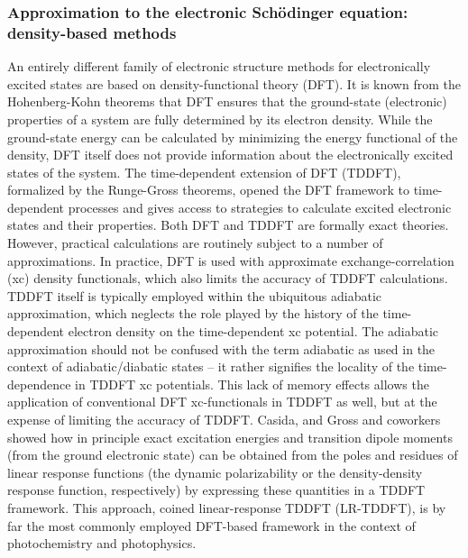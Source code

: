 \documentclass[9pt,bestpractices,pubversion]{livecoms}
\begin{document}
\subsubsection{Approximation to the electronic Sch\"{o}dinger equation: density-based methods}
\label{sec:dftbased}

An entirely different family of electronic structure methods for electronically excited states are based on density-functional theory (DFT). It is known from the Hohenberg-Kohn theorems\cite{hohenberg64} that DFT ensures that the ground-state (electronic) properties of a system are fully determined by its electron density. While the ground-state energy can be calculated by minimizing the energy functional of the density, DFT itself does not provide information about the electronically excited states of the system. The time-dependent extension of DFT (TDDFT),\cite{tddftcarsten} formalized by the Runge-Gross theorems,\cite{Runge84} opened the DFT framework to time-dependent processes and gives access to strategies to calculate excited electronic states and their properties. Both DFT and TDDFT are formally exact theories. However, practical calculations are routinely subject to a number of approximations. In practice, DFT is used with approximate exchange-correlation (xc) density functionals, which also limits the accuracy of TDDFT calculations. TDDFT itself is typically employed within the ubiquitous adiabatic approximation, which neglects the role played by the history of the time-dependent electron density on the time-dependent xc potential.\cite{casida2012progress,tddftcarsten} The adiabatic approximation should not be confused with the term adiabatic as used in the context of adiabatic/diabatic states -- it rather signifies the locality of the time-dependence in TDDFT xc potentials. This lack of memory effects allows the application of conventional DFT xc-functionals in TDDFT as well, but at the expense of limiting the accuracy of TDDFT. Casida\cite{casida95}, and Gross and coworkers\cite{petersilka_excitation_1996} showed how in principle exact excitation energies and transition dipole moments (from the ground electronic state) can be obtained from the poles and residues of linear response functions (the dynamic polarizability or the density-density response function, respectively) by expressing these quantities in a TDDFT framework.\cite{tddftcarsten,agostini2018tddft} This approach, coined linear-response TDDFT (LR-TDDFT), is by far the most commonly employed DFT-based framework in the context of photochemistry and photophysics.
\end{document}
